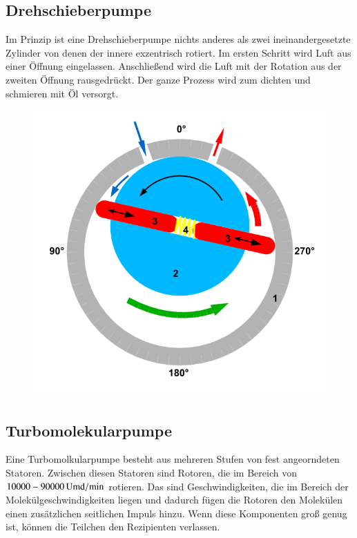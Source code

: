 \subsection*{Drehschieberpumpe}

Im Prinzip ist eine Drehschieberpumpe nichts anderes als zwei ineinandergesetzte Zylinder von denen der innere exzentrisch rotiert. Im ersten Schritt wird Luft aus einer Öffnung eingelassen. Anschließend wird die Luft mit der Rotation aus der zweiten Öffnung rausgedrückt. Der ganze Prozess wird zum dichten und schmieren mit Öl versorgt.

\begin{figure}[h]
	\centering
	\includegraphics[scale=0.3]{Drehschieberpumpe_Schema.png}
\end{figure}


\subsection*{Turbomolekularpumpe}

Eine Turbomolkularpumpe besteht aus mehreren Stufen von fest angeorndeten Statoren. Zwischen diesen Statoren sind Rotoren, die im Bereich von $\unit[10000 - 90000]{Umd/min}$ rotieren. Das sind Geschwindigkeiten, die im Bereich der Molekülgeschwindigkeiten liegen und dadurch fügen die Rotoren den Molekülen einen zusätzlichen seitlichen Impuls hinzu. Wenn diese Komponenten groß genug ist, können die Teilchen den Rezipienten verlassen.


